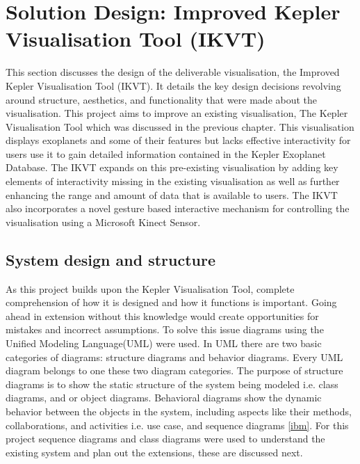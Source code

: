 \chapter{Solution Design: Improved Kepler Visualisation Tool (IKVT)}\label{C:sd}
This section discusses the design of the deliverable visualisation, the Improved
Kepler Visualisation Tool (IKVT). It details
the key design decisions revolving around structure, aesthetics, and
functionality that were made about the visualisation. 
This project aims to improve an existing visualisation, The Kepler Visualisation
Tool which was discussed in the previous chapter. This 
visualisation displays exoplanets and some of their features but lacks effective
interactivity for users use it to gain detailed information contained in the
Kepler Exoplanet Database. The IKVT expands on this pre-existing
visualisation by adding key elements of interactivity missing in the existing
 visualisation as well as further enhancing the range and amount of data that
is available to users. The IKVT also incorporates a novel
gesture based interactive mechanism for controlling the visualisation using a Microsoft
Kinect Sensor.

\section{System design and structure}
As this project builds upon the Kepler Visualisation
Tool, complete comprehension of
how it is designed and how it functions is important. Going ahead in extension without this knowledge would create opportunities
for mistakes and incorrect assumptions. To solve this issue diagrams using the Unified Modeling Language(UML) were used. In UML there are two basic categories of diagrams: structure diagrams and
behavior diagrams. Every UML diagram belongs to one these two diagram
categories. The purpose of structure diagrams is to show the static structure of
the system being modeled i.e. class diagrams, and or object diagrams. Behavioral
diagrams show the dynamic behavior between the objects in
the system, including aspects like their methods, collaborations, and activities
i.e. use case, and sequence diagrams \ref{ibm}. For this project sequence diagrams and class diagrams were used to
understand the existing system and plan out the extensions, these are discussed
next.

